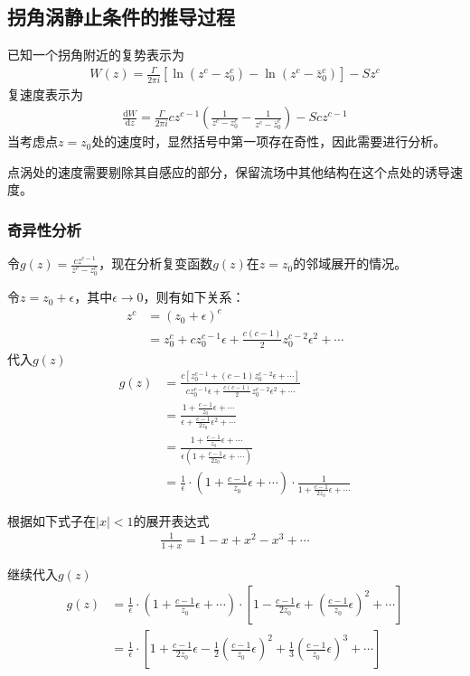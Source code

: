 \subsection{拐角涡静止条件的推导过程}
已知一个拐角附近的复势表示为
\begin{align}
    W(z)=\frac{\Gamma}{2\pi i}\left[\ln(z^{c}-z_{0}^{c})-\ln(z^{c}-\bar{z}_{0}^{c})\right]-Sz^{c}
\end{align}
复速度表示为
\begin{align}
    \frac{\mathrm{d}W}{\mathrm{d}z}=\frac{\Gamma}{2\pi i}cz^{c-1}\left(\frac{1}{z^{c}-z_{0}^{c}}-\frac{1}{z^{c}-\bar{z}_{0}^{c}}\right)-Scz^{c-1}
\end{align}
当考虑点$z=z_{0}$处的速度时，显然括号中第一项存在奇性，因此需要进行分析。

点涡处的速度需要剔除其自感应的部分，保留流场中其他结构在这个点处的诱导速度。
\subsubsection{奇异性分析}
令$g(z)=\frac{cz^{c-1}}{z^{c}-z_{0}^{c}}$，现在分析复变函数$g(z)$在$z=z_{0}$的邻域展开的情况。

令$z=z_{0}+\epsilon$，其中$\epsilon\rightarrow0$，则有如下关系：
\begin{align*}
    z^{c}&=(z_{0}+\epsilon)^{c}\\
    &=z_{0}^{c}+cz_{0}^{c-1}\epsilon+\frac{c(c-1)}{2}z_{0}^{c-2}\epsilon^{2}+\cdots
\end{align*}
代入$g(z)$
\begin{align*}
    g(z)&=\frac{c[z_{0}^{c-1}+(c-1)z_{0}^{c-2}\epsilon+\cdots]}{cz_{0}^{c-1}\epsilon+\frac{c(c-1)}{2}z_{0}^{c-2}\epsilon^{2}+\cdots}\\
    &=\frac{1+\frac{c-1}{z_{0}}\epsilon+\cdots}{\epsilon+\frac{c-1}{2z_{0}}\epsilon^{2}+\cdots}\\
    &=\frac{1+\frac{c-1}{z_{0}}\epsilon+\cdots}{\epsilon(1+\frac{c-1}{2z_{0}}\epsilon+\cdots)}\\
    &=\frac{1}{\epsilon}\cdot\left(1+\frac{c-1}{z_{0}}\epsilon+\cdots\right)\cdot\frac{1}{1+\frac{c-1}{2z_{0}}\epsilon+\cdots}
\end{align*}

根据如下式子在$|x|<1$的展开表达式
\begin{align*}
    \frac{1}{1+x}=1-x+x^{2}-x^{3}+\cdots
\end{align*}

继续代入$g(z)$
\begin{align}
    g(z)&=\frac{1}{\epsilon}\cdot\left(1+\frac{c-1}{z_{0}}\epsilon+\cdots\right)\cdot\left[1-\frac{c-1}{2z_{0}}\epsilon+\left(\frac{c-1}{z_{0}}\epsilon\right)^{2}+\cdots\right]\\
    &=\frac{1}{\epsilon}\cdot\left[1+\frac{c-1}{2z_{0}}\epsilon-\frac{1}{2}\left(\frac{c-1}{z_{0}}\epsilon\right)^{2}+\frac{1}{3}\left(\frac{c-1}{z_{0}}\epsilon\right)^{3}+\cdots\right]
\end{align}

